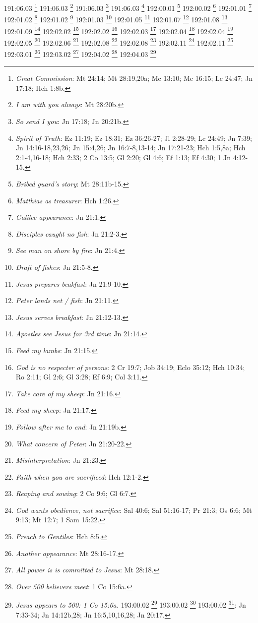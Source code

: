 {{{{{{{{{{{{{{{{{{{{{{{{{{{{{{{{{{{{{{{{{{{{{{{{{{{{{{{{{{{{{{{{{{{{{{{{{{{{{{{{{{{{{{{{{{{{{{{191:06.03 \footnote{\textit{Great Commission}: Mt 24:14; Mt 28:19,20a; Mc 13:10; Mc 16:15; Lc 24:47; Jn 17:18; Hch 1:8b.}
191:06.03 \footnote{\textit{I am with you always}: Mt 28:20b.}
191:06.03 \footnote{\textit{So send I you}: Jn 17:18; Jn 20:21b.}
191:06.03 \footnote{\textit{Spirit of Truth}: Ez 11:19; Ez 18:31; Ez 36:26-27; Jl 2:28-29; Lc 24:49; Jn 7:39; Jn 14:16-18,23,26; Jn 15:4,26; Jn 16:7-8,13-14; Jn 17:21-23; Hch 1:5,8a; Hch 2:1-4,16-18; Hch 2:33; 2 Co 13:5; Gl 2:20; Gl 4:6; Ef 1:13; Ef 4:30; 1 Jn 4:12-15.}
192:00.01 \footnote{\textit{Bribed guard's story}: Mt 28:11b-15.}
192:00.02 \footnote{\textit{Matthias as treasurer}: Hch 1:26.}
192:01.01 \footnote{\textit{Galilee appearance}: Jn 21:1.}
192:01.02 \footnote{\textit{Disciples caught no fish}: Jn 21:2-3.}
192:01.02 \footnote{\textit{See man on shore by fire}: Jn 21:4.}
192:01.03 \footnote{\textit{Draft of fishes}: Jn 21:5-8.}
192:01.05 \footnote{\textit{Jesus prepares beakfast}: Jn 21:9-10.}
192:01.07 \footnote{\textit{Peter lands net / fish}: Jn 21:11.}
192:01.08 \footnote{\textit{Jesus serves breakfast}: Jn 21:12-13.}
192:01.09 \footnote{\textit{Apostles see Jesus for 3rd time}: Jn 21:14.}
192:02.02 \footnote{\textit{Feed my lambs}: Jn 21:15.}
192:02.02 \footnote{\textit{God is no respecter of persons}: 2 Cr 19:7; Job 34:19; Eclo 35:12; Hch 10:34; Ro 2:11; Gl 2:6; Gl 3:28; Ef 6:9; Col 3:11.}
192:02.03 \footnote{\textit{Take care of my sheep}: Jn 21:16.}
192:02.04 \footnote{\textit{Feed my sheep}: Jn 21:17.}
192:02.04 \footnote{\textit{Follow after me to end}: Jn 21:19b.}
192:02.05 \footnote{\textit{What concern of Peter}: Jn 21:20-22.}
192:02.06 \footnote{\textit{Misinterpretation}: Jn 21:23.}
192:02.08 \footnote{\textit{Faith when you are sacrificed}: Hch 12:1-2.}
192:02.08 \footnote{\textit{Reaping and sowing}: 2 Co 9:6; Gl 6:7.}
192:02.11 \footnote{\textit{God wants obedience, not sacrifice}: Sal 40:6; Sal 51:16-17; Pr 21:3; Os 6:6; Mt 9:13; Mt 12:7; 1 Sam 15:22.}
192:02.11 \footnote{\textit{Preach to Gentiles}: Hch 8:5.}
192:03.01 \footnote{\textit{Another appearance}: Mt 28:16-17.}
192:03.02 \footnote{\textit{All power is is committed to Jesus}: Mt 28:18.}
192:04.02 \footnote{\textit{Over 500 believers meet}: 1 Co 15:6a.}
192:04.03 \footnote{\textit{Jesus appears to 500: 1 Co 15:6a.}
193:00.02 \footnote{\textit{Jesus' discourse to leaders}: Lc 24:44-48.}
193:00.02 \footnote{\textit{Told of death & resurrection}: Mt 16:21; Mt 17:22-23a; Mt 20:17-19; Mt 27:63; Mc 8:31; Mc 9:31; Mc 10:32-34; Lc 9:22,31,43b-44; Lc 18:31-33; Lc 24:7,46; Jn 14:28a; Jn 20:9.}
193:00.02 \footnote{\textit{Told}: Jesus must return to Father}: Jn 7:33-34; Jn 14:12b,28; Jn 16:5,10,16,28; Jn 20:17.}
}}}}}}}}}}}}}}}}}}}}}}}}}}}}}}}}}}}}}}}}}}}}}}}}}}}}}}}}}}}}}}}}}}}}}}}}}}}}}}}}}}}}}}}}}}}}}}}
